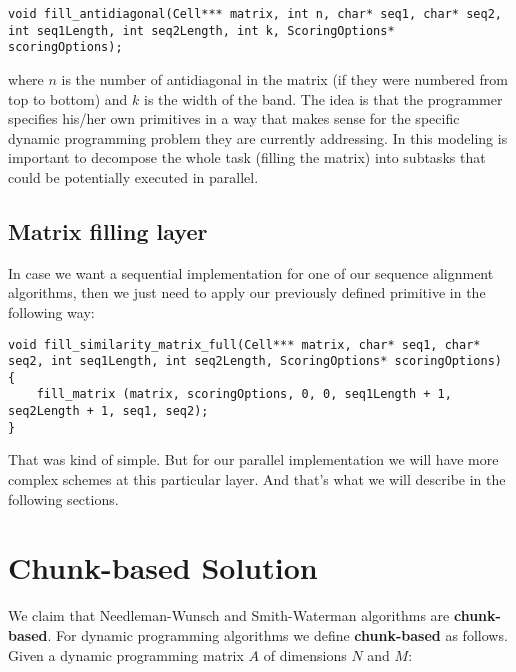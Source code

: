 \documentclass[journal]{IEEEtran}
\begin{document}
\lstset{language=C}
\begin{lstlisting}[linewidth=\columnwidth,breaklines=true]
void fill_antidiagonal(Cell*** matrix, int n, char* seq1, char* seq2, int seq1Length, int seq2Length, int k, ScoringOptions* scoringOptions);
\end{lstlisting}

where $n$ is the number of antidiagonal in the matrix (if they were numbered from top to bottom) and $k$ is the width of the band. The idea is that the programmer specifies his/her own primitives in a way that makes sense for the specific dynamic programming problem they are currently addressing. In this modeling is important to decompose the whole task (filling the matrix) into subtasks that could be potentially executed in parallel.

\subsection{Matrix filling layer}

In case we want a sequential implementation for one of our  sequence alignment algorithms, then we just need to apply our previously defined primitive in the following way:

\lstset{language=C}
\begin{lstlisting}[linewidth=\columnwidth,breaklines=true]
void fill_similarity_matrix_full(Cell*** matrix, char* seq1, char* seq2, int seq1Length, int seq2Length, ScoringOptions* scoringOptions) 
{
    fill_matrix (matrix, scoringOptions, 0, 0, seq1Length + 1, seq2Length + 1, seq1, seq2);
}
\end{lstlisting}

That was kind of simple. But for our parallel implementation we will have more complex schemes at this particular layer. And that's what we will describe in the following sections.

\section{Chunk-based Solution}

We claim that Needleman-Wunsch and Smith-Waterman algorithms are \textbf{chunk-based}. For dynamic programming algorithms we define \textbf{chunk-based} as follows. Given a dynamic programming matrix $A$ of dimensions $N$ and $M$:
\end{document}
